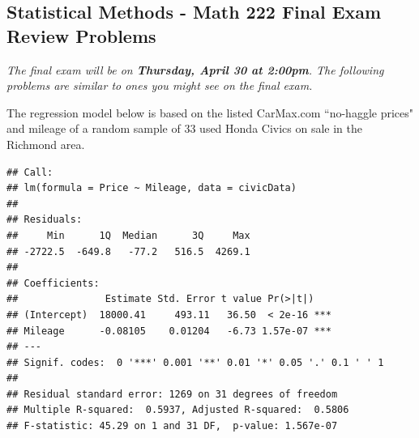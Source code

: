 \documentclass[11pt]{exam}
\begin{document}
\graphicspath{{/home/brian/Dropbox/HSC/Spring13/Math121/}}

\subsection*{Statistical Methods - Math 222 \hfill Final Exam Review Problems}

\textit{The final exam will be on \textbf{Thursday, April 30 at 2:00pm}. The following problems are similar to ones you might see on the final exam.}


\begin{questions}

\question The regression model below is based on the listed CarMax.com ``no-haggle prices" and mileage of a random sample of 33 used Honda Civics on sale in the Richmond area.

{\small
\begin{verbatim}
## Call:
## lm(formula = Price ~ Mileage, data = civicData)
## 
## Residuals:
##     Min      1Q  Median      3Q     Max 
## -2722.5  -649.8   -77.2   516.5  4269.1 
## 
## Coefficients:
##               Estimate Std. Error t value Pr(>|t|)    
## (Intercept)  18000.41     493.11   36.50  < 2e-16 ***
## Mileage      -0.08105    0.01204   -6.73 1.57e-07 ***
## ---
## Signif. codes:  0 '***' 0.001 '**' 0.01 '*' 0.05 '.' 0.1 ' ' 1
## 
## Residual standard error: 1269 on 31 degrees of freedom
## Multiple R-squared:  0.5937, Adjusted R-squared:  0.5806 
## F-statistic: 45.29 on 1 and 31 DF,  p-value: 1.567e-07
\end{verbatim}
}
\end{questions}
\end{document}
